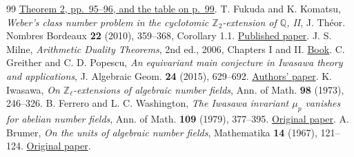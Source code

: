 \documentclass[a4paper,11pt]{article}
\theoremstyle{definition}
\theoremstyle{remark}
\newcommand{\ZZ}{\mathbb Z}\newcommand{\ord}{\operatorname{ord}}
\numberwithin{equation}{section}
\begin{document}
\begin{thebibliography}{99}
\href{https://www.jstage.jst.go.jp/article/jmath1948/38/1/38_1_95/_pdf}{Theorem 2, pp.~95--96, and the table on p.~99}.
 T. Fukuda and K. Komatsu, \emph{Weber's class number problem in the cyclotomic $\mathbb Z_2$-extension of $\mathbb Q$, II}, J. Th\'eor. Nombres Bordeaux \textbf{22} (2010), 359--368, Corollary 1.1. \href{https://www.numdam.org/article/JTNB_2010__22_2_359_0.pdf}{Published paper}.
 J. S. Milne, \emph{Arithmetic Duality Theorems}, 2nd ed., 2006, Chapters I and II. \href{https://www.jmilne.org/math/Books/ADTnot.pdf}{Book}.
 C. Greither and C. D. Popescu, \emph{An equivariant main conjecture in Iwasawa theory and applications}, J. Algebraic Geom. \textbf{24} (2015), 629--692. \href{https://arxiv.org/abs/1103.3069}{Authors' paper}.
 K. Iwasawa, \emph{On \(\ZZ_\ell\)-extensions of algebraic number fields}, Ann. of Math. \textbf{98} (1973), 246--326.
 B. Ferrero and L. C. Washington, \emph{The Iwasawa invariant \(\mu_p\) vanishes for abelian number fields}, Ann. of Math. \textbf{109} (1979), 377--395. \href{https://doi.org/10.2307/1971116}{Original paper}.
 A. Brumer, \emph{On the units of algebraic number fields}, Mathematika \textbf{14} (1967), 121--124. \href{https://doi.org/10.1112/S0025579300003703}{Original paper}.
\end{thebibliography}\endgroup
\end{document}
